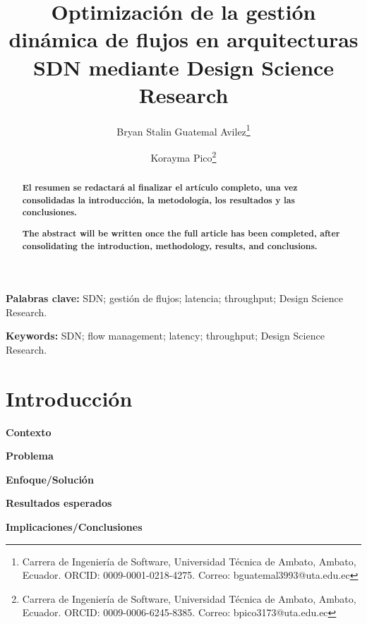 \documentclass[12pt,a4paper]{article}
\title{\textbf{Optimización de la gestión dinámica de flujos en arquitecturas SDN mediante Design Science Research}}
\author{
Bryan Stalin Guatemal Avilez\thanks{Carrera de Ingeniería de Software, Universidad Técnica de Ambato, Ambato, Ecuador. ORCID: 0009-0001-0218-4275. Correo: bguatemal3993@uta.edu.ec}
\and
Korayma Pico\thanks{Carrera de Ingeniería de Software, Universidad Técnica de Ambato, Ambato, Ecuador. ORCID: 0009-0006-6245-8385. Correo: bpico3173@uta.edu.ec}
}
\date{}
\newcommand{\introbox}[2]{%
    \colorbox{#1}{\strut\footnotesize\textbf{#2}}%
}
\newcommand{\resumenpendiente}{
    \begin{center}
    \setlength{\fboxsep}{8pt}
    \colorbox{yellow!45}{
        \parbox{0.92\linewidth}{
            \centering \textbf{El resumen se redactará al finalizar el artículo completo, una vez consolidadas la introducción, la metodología, los resultados y las conclusiones.}
        }
    }
    \end{center}
}
\begin{document}
\maketitle

\begin{abstract}
\resumenpendiente
\end{abstract}

\vspace{0.3cm}
\noindent\textbf{Palabras clave:} SDN; gestión de flujos; latencia; throughput; Design Science Research.

\begin{otherlanguage}{english}
\begin{abstract}
\begin{center}
\setlength{\fboxsep}{8pt}
\colorbox{yellow!45}{
    \parbox{0.92\linewidth}{
        \centering \textbf{The abstract will be written once the full article has been completed, after consolidating the introduction, methodology, results, and conclusions.}
    }
}
\end{center}
\end{abstract}

\vspace{0.3cm}
\noindent\textbf{Keywords:} SDN; flow management; latency; throughput; Design Science Research.
\end{otherlanguage}

\section{Introducción}

\noindent
\introbox{introcontext}{Contexto}\hspace{0.2cm}
\introbox{introproblem}{Problema}\hspace{0.2cm}
\introbox{introsolution}{Enfoque/Solución}\hspace{0.2cm}
\introbox{introresults}{Resultados esperados}\hspace{0.2cm}
\introbox{introimp}{Implicaciones/Conclusiones}

\vspace{0.4cm}
\end{document}
